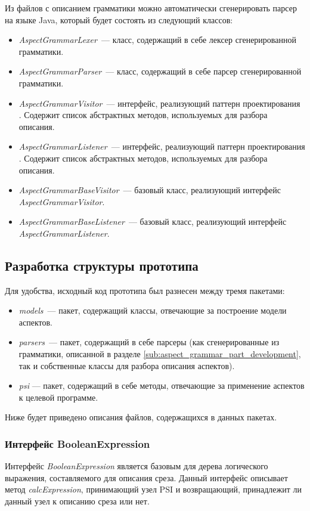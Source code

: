 Из файлов с описанием грамматики можно автоматически сгенерировать парсер на языке Java, который будет состоять из следующий классов:
\begin{itemize}
	\item \textit{AspectGrammarLexer}~--- класс, содержащий в себе лексер
		  сгенерированной грамматики.
	\item \textit{AspectGrammarParser}~--- класс, содержащий в себе парсер
		  сгенерированной грамматики.
	\item \textit{AspectGrammarVisitor}~--- интерфейс, реализующий паттерн проектирования .
	Содержит список абстрактных методов, используемых для разбора описания.
	\item \textit{AspectGrammarListener}~--- интерфейс, реализующий паттерн проектирования .
	Содержит список абстрактных методов, используемых для разбора описания.
	\item \textit{AspectGrammarBaseVisitor}~--- базовый класс, реализующий
		  интерфейс \textit{AspectGrammarVisitor}.
	\item \textit{AspectGrammarBaseListener}~--- базовый класс, реализующий
		  интерфейс \textit{AspectGrammarListener}.
\end{itemize}
\subsection{Разработка структуры прототипа}
\label{sub:aspect_weaving_part_development}
Для удобства, исходный код прототипа был разнесен между тремя пакетами:
\begin{itemize}
	\item \textit{models}~--- пакет, содержащий классы, отвечающие за построение
		  модели аспектов.
	\item \textit{parsers}~--- пакет, содержащий в себе парсеры (как
	сгенерированные из грамматики, описанной в разделе
	\ref{sub:aspect_grammar_part_development}, так и собственные классы для
	разбора описания аспектов).
	\item \textit{psi} --- пакет, содержащий в себе методы, отвечающие за
		  применение аспектов к целевой программе.
\end{itemize}
Ниже будет приведено описания файлов, содержащихся в данных пакетах.
\subsubsection{Интерфейс BooleanExpression}
\label{ssub:BooleanExpression}
Интерфейс \textit{BooleanExpression} является базовым для дерева логического
выражения, составляемого для описания среза.
Данный интерфейс описывает метод \textit{calcExpression}, принимающий узел PSI и возвращающий, принадлежит ли данный узел к описанию среза или нет.

